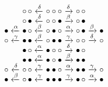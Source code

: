 \documentclass{slides}
\begin{document}
\begin{equation*}
\begin{array}{@{}r@{\;}c@{\;}r@{\;}c@{\;}c@{\;}c@{\;}l@{\;}c@{\;}l@{}}
&& \circ \, \circ
& \xleftarrow{\smash{\delta}}
& \circ \circ \circ
& \xrightarrow{\smash{\delta}}
& \circ \, \circ\\
&& \circ \, \bullet
& \xleftarrow{\smash{\delta}}
& \circ \circ \bullet
& \xrightarrow{\smash{\beta}}
& \circ \, \bullet\\
  \bullet
& \xleftarrow{\smash{\alpha}}
& \bullet \, \circ
& \xleftarrow{\smash{\beta}}
& \circ \bullet \circ
& \xrightarrow{\smash{\alpha}}
& \circ \, \bullet
& \xrightarrow{\smash{\beta}}
& \bullet\\
  \circ
& \xleftarrow{\smash{\gamma}}
& \bullet \, \bullet
& \xleftarrow{\smash{\beta}}
& \circ \bullet \bullet
& \xrightarrow{\smash{\gamma}}
& \circ \, \circ
& \xrightarrow{\smash{\delta}}
& \circ\\
&& \bullet \, \circ
& \xleftarrow{\smash{\alpha}}
& \bullet \circ \circ
& \xrightarrow{\smash{\delta}}
& \bullet \, \circ\\
&& \bullet \, \bullet
& \xleftarrow{\smash{\alpha}} 
& \bullet \circ \bullet
& \xrightarrow{\smash{\beta}} 
& \bullet \, \bullet\\
  \circ
& \xleftarrow{\smash{\delta}} 
& \circ \, \circ
& \xleftarrow{\smash{\gamma}}
& \bullet \bullet \circ
& \xrightarrow{\smash{\alpha}}
& \bullet \, \bullet
& \xrightarrow{\smash{\gamma}}
& \circ\\
  \bullet
& \xleftarrow{\smash{\beta}}
& \circ \, \bullet
& \xleftarrow{\smash{\gamma}}
& \bullet \bullet \bullet
& \xrightarrow{\smash{\gamma}}
& \bullet \, \circ
& \xrightarrow{\smash{\alpha}}
& \bullet
\end{array}
\end{equation*}
\end{document}
